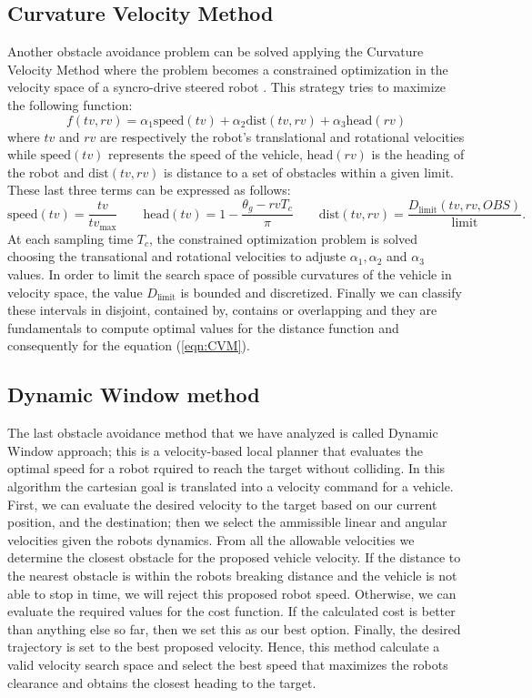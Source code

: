 \subsection{Curvature Velocity Method}
Another obstacle avoidance problem can be solved applying the
Curvature Velocity Method where the problem becomes a constrained optimization in the velocity space of a syncro-drive steered robot \cite{CVM2003}. This strategy tries to maximize
the following function:
\begin{equation}
\label{eqn:CVM}
	f(tv,rv)=\alpha_1\text{speed}(tv)+\alpha_2\text{dist}(tv,rv)+\alpha_3\text{head}(rv)
\end{equation}
where $tv$ and $rv$ are respectively the robot’s translational and rotational velocities while $\text{speed}(tv)$ represents the speed of the vehicle, $\text{head}(rv)$ is the heading of the robot and $\text{dist}(tv,rv)$ is distance to a set of obstacles within a given limit. These last three terms can be expressed as follows:
\begin{equation}
	\text{speed}(tv) = \frac{tv}{tv_{\text{max}}}\qquad 
	\text{head}(tv) = 1-\frac{\theta_g-rvT_c}{\pi}\qquad
	\text{dist}(tv,rv)=\frac{D_{\text{limit}}(tv,rv,OBS)}{\text{limit}}.
\end{equation}
At each sampling time $T_c$, the constrained optimization problem is solved choosing the transational and rotational velocities to adjuste $\alpha_1,\alpha_2$ and $\alpha_3$ values. In order to limit the search space of possible curvatures of the vehicle in velocity space, the value $D_\text{limit}$ is bounded and discretized. Finally we can classify these intervals in disjoint, contained by, contains or overlapping and they are fundamentals to compute optimal values for the distance function and consequently for the equation (\ref{eqn:CVM}).

\subsection{Dynamic Window method}
The last obstacle avoidance method that we have analyzed is called Dynamic Window approach; this is a velocity-based local planner that evaluates the optimal speed for a robot rquired to reach the target without colliding. In this algorithm the cartesian goal is translated into a velocity command for a vehicle. First, we can evaluate the desired velocity to the target based on our current position, and the destination; then we select the ammissible linear and angular velocities given the robots dynamics. From all the allowable velocities we determine the closest obstacle for the proposed vehicle velocity. If the distance to the nearest obstacle is within the robots breaking distance and the vehicle is not able to stop in time, we will reject this proposed robot speed.
Otherwise, we can evaluate the required values for the cost function. If the calculated cost is better than anything else so far, then we set this as our best option. Finally, the desired trajectory is set to the best proposed velocity.
Hence, this method calculate a valid velocity search space and select the best speed that maximizes the robots clearance and obtains the closest heading to the target.

